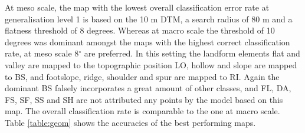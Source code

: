 \documentclass[preprint,12pt,authoryear]{elsarticle}
\begin{document}
At meso scale, the map with the lowest overall classification error rate at generalisation level 1 is based on the 10 m DTM, a search radius of 80 m and a flatness threshold of 8 degrees. Whereas at macro scale the threshold of 10 degrees was dominant amongst the maps with the highest correct classification rate, at meso scale 8$^{\circ}$ are preferred. In this setting the landform elements flat and valley are mapped to the topographic position LO, hollow and slope are mapped to BS, and footslope, ridge, shoulder and spur are mapped to RI. Again the dominant BS falsely incorporates a great amount of other classes, and FL, DA, FS, SF, SS and SH are not attributed any points by the model based on this map. The overall classification rate is comparable to the one at macro scale.  Table \ref{table:geom} shows the accuracies of the best performing maps.
\end{document}
